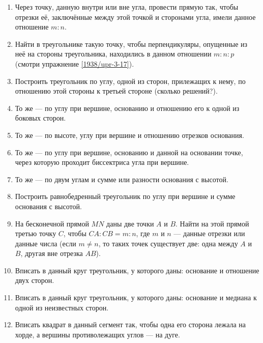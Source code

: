 \documentclass[twoside]{book}
\begin{document}
\begin{center}
\end{center}

\begin{enumerate}[resume]

 \item
Через точку, данную внутри или вне угла, провести прямую так, чтобы отрезки её, заключённые между этой точкой и сторонами угла, имели данное отношение $m:n$.

 \item
Найти в треугольнике такую точку, чтобы перпендикуляры, опущенные из неё на стороны треугольника, находились в данном отношении $m:n:p$ (смотри упражнение \ref{1938/upr-3-17}).

 \item
Построить треугольник по углу, одной из сторон, прилежащих к нему, по отношению этой стороны к третьей стороне (сколько решений?).

 \item
То же — по углу при вершине, основанию и отношению его к одной из боковых сторон.

 \item
То же — по высоте, углу при вершине и отношению отрезков основания.

 \item
То же — по углу при вершине, основанию и данной на основании точке, через которую проходит биссектриса угла при вершине.

 \item
То же — по двум углам и сумме или разности основания с высотой.

 \item
Построить равнобедренный треугольник по углу при вершине и сумме основания с высотой.

 \item
На бесконечной прямой $MN$ даны две точки $A$ и $B$.
Найти на этой прямой третью точку $C$, чтобы $CA:CB=m:n$, где $m$ и $n$ — данные отрезки или данные числа (если $m\ne n$, то таких точек существует две:
одна между $A$ и $B$, другая вне отрезка $AB$).

 \item
Вписать в данный круг треугольник, у которого даны:
основание и отношение двух сторон.

 \item
Вписать в данный круг треугольник, у которого даны:
основание и медиана к одной из неизвестных сторон. 

 \item
Вписать квадрат в данный сегмент так, чтобы одна его сторона лежала на хорде, а вершины противолежащих углов — на дуге.


\end{enumerate}
\end{document}
